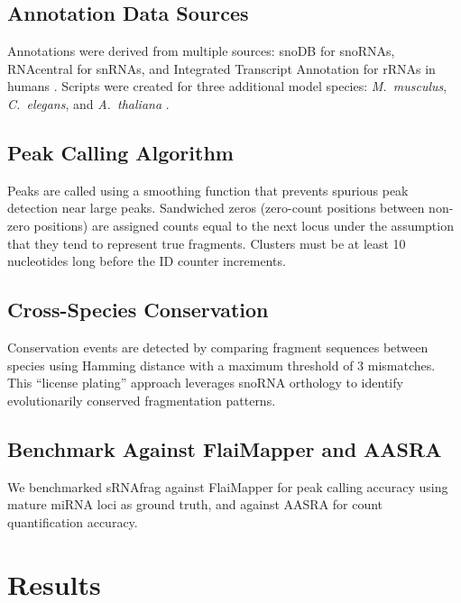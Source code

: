 \documentclass{article}
\begin{document}
\subsection{Annotation Data Sources}

Annotations were derived from multiple sources: snoDB for snoRNAs, RNAcentral for snRNAs, and Integrated Transcript Annotation for rRNAs in humans \citep{dupuis2019snodb, rnacentral2021, williams2020ita}. Scripts were created for three additional model species: \textit{M.~musculus}, \textit{C.~elegans}, and \textit{A.~thaliana} \citep{ncbi2023annotations}.

\subsection{Peak Calling Algorithm}

Peaks are called using a smoothing function that prevents spurious peak detection near large peaks. Sandwiched zeros (zero-count positions between non-zero positions) are assigned counts equal to the next locus under the assumption that they tend to represent true fragments. Clusters must be at least 10 nucleotides long before the ID counter increments.

\subsection{Cross-Species Conservation}

Conservation events are detected by comparing fragment sequences between species using Hamming distance with a maximum threshold of 3 mismatches. This ``license plating'' approach leverages snoRNA orthology \citep{dupuis2019snodb, yoshihama2013snopy} to identify evolutionarily conserved fragmentation patterns.

\subsection{Benchmark Against FlaiMapper and AASRA}

We benchmarked sRNAfrag against FlaiMapper \citep{hoogstrate2015flairmapper} for peak calling accuracy using mature miRNA loci as ground truth, and against AASRA \citep{koenig2021aasra} for count quantification accuracy.

\section{Results}
\end{document}
